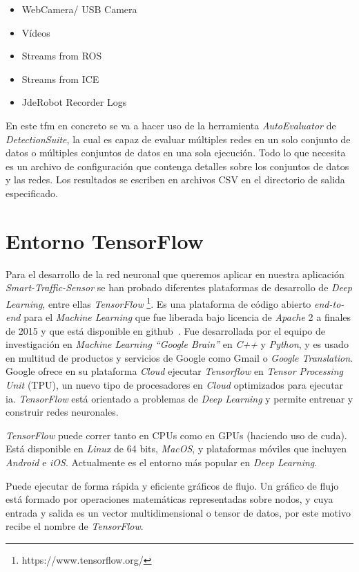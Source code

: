 \begin{itemize}
    \item WebCamera/ USB Camera
    \item Vídeos
    \item Streams from ROS
    \item Streams from ICE
    \item JdeRobot Recorder Logs
\end{itemize}

En este \acrshort{tfm} en concreto se va a hacer uso de la herramienta \textit{AutoEvaluator} de \textit{DetectionSuite}, la cual es capaz de evaluar múltiples redes en un solo conjunto de datos o múltiples conjuntos de datos en una sola ejecución. Todo lo que necesita es un archivo de configuración que contenga detalles sobre los conjuntos de datos y las redes. Los resultados se escriben en archivos CSV en el directorio de salida especificado.

\section{Entorno TensorFlow}
Para el desarrollo de la red neuronal que queremos aplicar en nuestra aplicación \textit{Smart-Traffic-Sensor} se  han probado diferentes plataformas de desarrollo de \textit{Deep Learning}, entre ellas \textit{TensorFlow} \footnote{https://www.tensorflow.org/}. Es una plataforma de código abierto \textit{end-to-end} para el \textit{Machine Learning} que fue liberada bajo licencia de \textit{Apache} 2 a finales de 2015 y que está disponible en github~\cite{github_tensorflow}. Fue desarrollada por el equipo de investigación en \textit{Machine Learning “Google Brain”}  en \textit{C++} y \textit{Python}, y es usado en multitud de productos y servicios de Google como Gmail o \textit{Google Translation}. Google ofrece en su plataforma \textit{Cloud} ejecutar \textit{Tensorflow} en \textit{Tensor Processing Unit} (TPU), un nuevo tipo de procesadores en \textit{Cloud} optimizados para ejecutar \acrfull{ia}.  \textit{TensorFlow} está orientado a problemas de \textit{Deep Learning} y permite entrenar y construir redes neuronales. 

\textit{TensorFlow} puede correr tanto en CPUs como en GPUs (haciendo uso de \acrfull{cuda}). Está disponible en \textit{Linux} de 64 bits, \textit{MacOS}, y plataformas móviles que incluyen \textit{Android} e \textit{iOS}. Actualmente es el entorno más popular en \textit{Deep Learning}.

Puede ejecutar de forma rápida y eficiente gráficos de flujo. Un gráfico de flujo está formado por operaciones matemáticas representadas sobre nodos, y cuya entrada y salida es un vector multidimensional o tensor de datos, por este motivo recibe el nombre de \textit{TensorFlow}.

